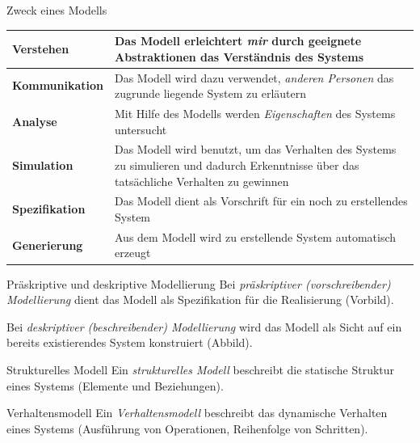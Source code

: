 \begin{bonus}{Zweck eines Modells}
    \begin{tabularx}{\textwidth}{|l|X|}
        \hline
        \bfseries Verstehen     & Das Modell erleichtert \emph{mir} durch geeignete Abstraktionen das Verständnis des Systems                                              \\
        \hline
        \bfseries Kommunikation & Das Modell wird dazu verwendet, \emph{anderen Personen} das zugrunde liegende System zu erläutern                                        \\
        \hline
        \bfseries Analyse       & Mit Hilfe des Modells werden \emph{Eigenschaften} des Systems untersucht                                                                 \\
        \hline
        \bfseries Simulation    & Das Modell wird benutzt, um das Verhalten des Systems zu simulieren und dadurch Erkenntnisse über das tatsächliche Verhalten zu gewinnen \\
        \hline
        \bfseries Spezifikation & Das Modell dient als Vorschrift für ein noch zu erstellendes System                                                                      \\
        \hline
        \bfseries Generierung   & Aus dem Modell wird zu erstellende System automatisch erzeugt                                                                            \\
        \hline
    \end{tabularx}
\end{bonus}

\begin{defi}{Präskriptive und deskriptive Modellierung}
    Bei \emph{präskriptiver (vorschreibender) Modellierung} dient das Modell als Spezifikation für die Realisierung (Vorbild).

    Bei \emph{deskriptiver (beschreibender) Modellierung} wird das Modell als Sicht auf ein bereits existierendes System konstruiert (Abbild).
\end{defi}

\begin{defi}{Strukturelles Modell}
    Ein \emph{strukturelles Modell} beschreibt die statische Struktur eines Systems (Elemente und Beziehungen).
\end{defi}

\begin{defi}{Verhaltensmodell}
    Ein \emph{Verhaltensmodell} beschreibt das dynamische Verhalten eines Systems (Ausführung von Operationen, Reihenfolge von Schritten).
\end{defi}

